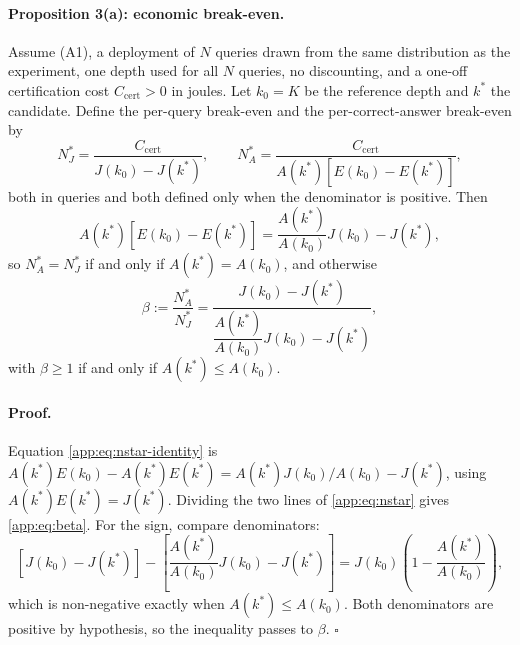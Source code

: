 \paragraph{Proposition 3(a): economic break-even.} Assume (A1), a deployment of
$N$ queries drawn from the same distribution as the experiment, one depth used
for all $N$ queries, no discounting, and a one-off certification cost
$C_{\mathrm{cert}}>0$ in joules. Let $k_{0}=K$ be the reference depth and
$k^{*}$ the candidate. Define the per-query break-even and the
per-correct-answer break-even by
\begin{equation}\label{app:eq:nstar}
  N^{*}_{J}=\frac{C_{\mathrm{cert}}}{J(k_{0})-J(k^{*})},
  \qquad
  N^{*}_{A}=\frac{C_{\mathrm{cert}}}{A(k^{*})\left[E(k_{0})-E(k^{*})\right]},
\end{equation}
both in queries and both defined only when the denominator is positive. Then
\begin{equation}\label{app:eq:nstar-identity}
  A(k^{*})\left[E(k_{0})-E(k^{*})\right]
  =\frac{A(k^{*})}{A(k_{0})}J(k_{0})-J(k^{*}),
\end{equation}
so $N^{*}_{A}=N^{*}_{J}$ if and only if $A(k^{*})=A(k_{0})$, and otherwise
\begin{equation}\label{app:eq:beta}
  \beta:=\frac{N^{*}_{A}}{N^{*}_{J}}
  =\frac{J(k_{0})-J(k^{*})}{\dfrac{A(k^{*})}{A(k_{0})}J(k_{0})-J(k^{*})},
\end{equation}
with $\beta\ge1$ if and only if $A(k^{*})\le A(k_{0})$.

\paragraph{Proof.} Equation \eqref{app:eq:nstar-identity} is
$A(k^{*})E(k_{0})-A(k^{*})E(k^{*})=A(k^{*})J(k_{0})/A(k_{0})-J(k^{*})$, using
$A(k^{*})E(k^{*})=J(k^{*})$. Dividing the two lines of \eqref{app:eq:nstar}
gives \eqref{app:eq:beta}. For the sign, compare denominators:
\begin{equation}\label{app:eq:beta-sign}
  \left[J(k_{0})-J(k^{*})\right]
  -\left[\frac{A(k^{*})}{A(k_{0})}J(k_{0})-J(k^{*})\right]
  =J(k_{0})\left(1-\frac{A(k^{*})}{A(k_{0})}\right),
\end{equation}
which is non-negative exactly when $A(k^{*})\le A(k_{0})$. Both denominators are
positive by hypothesis, so the inequality passes to $\beta$.
\hfill$\square$

